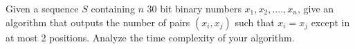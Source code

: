 Given a sequence $S$ containing $n$ 30 bit binary numbers
$x_1,x_2,....,x_n$, give an algorithm that outputs the number of pairs
$(x_i,x_j)$ such that $x_i = x_j$ except in at most 2
positions. Analyze the time complexity of your algorithm.

